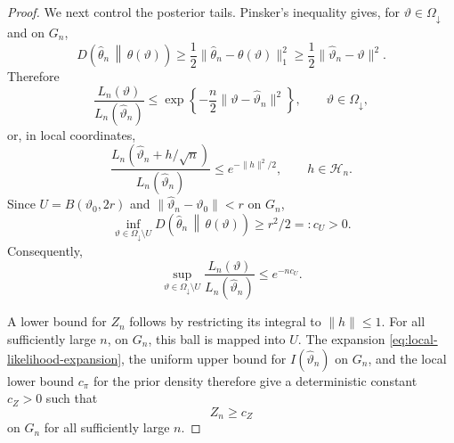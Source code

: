 \documentclass{article}
\theoremstyle{named}
\theoremstyle{named1}
\theoremstyle{plain}
\theoremstyle{remark}
\begin{document}
\begin{proof}
We next control the posterior tails. Pinsker's inequality gives, for
$\vartheta\in\Omega_{\downarrow}$ and on $G_n$,
\[
    D\!\left(\widehat\theta_n\,\middle\|\,\theta(\vartheta)\right)
    \geq\frac12\|\widehat\theta_n-\theta(\vartheta)\|_1^2
    \geq\frac12\|\widehat\vartheta_n-\vartheta\|^2.
\]
Therefore
\begin{equation}
    \frac{L_n(\vartheta)}{L_n(\widehat\vartheta_n)}
    \leq
    \exp\left\{-\frac n2\|\vartheta-\widehat\vartheta_n\|^2\right\},
    \qquad \vartheta\in\Omega_{\downarrow},
    \label{eq:local-gaussian-bound}
\end{equation}
or, in local coordinates,
\begin{equation}
    \frac{L_n(\widehat\vartheta_n+h/\sqrt n)}{
          L_n(\widehat\vartheta_n)}
    \leq e^{-\|h\|^2/2},
    \qquad h\in\mathcal H_n.
    \label{eq:local-h-bound}
\end{equation}
Since $U=B(\vartheta_0,2r)$ and
$\|\widehat\vartheta_n-\vartheta_0\|<r$ on $G_n$,
\begin{equation}
    \inf_{\vartheta\in\Omega_{\downarrow}\setminus U}
    D\!\left(\widehat\theta_n\,\middle\|\,\theta(\vartheta)\right)
    \geq r^2/2=:c_U>0.
    \label{outside_U_bound}
\end{equation}
Consequently,
\begin{equation}
    \sup_{\vartheta\in\Omega_{\downarrow}\setminus U}
    \frac{L_n(\vartheta)}{L_n(\widehat\vartheta_n)}
    \leq e^{-nc_U}.
    \label{eq:outside-neighborhood-bound}
\end{equation}

A lower bound for $Z_n$ follows by restricting its integral to
$\|h\|\leq1$. For all sufficiently large $n$, on $G_n$, this ball is
mapped into $U$. The expansion \eqref{eq:local-likelihood-expansion},
the uniform upper bound for $I(\widehat\vartheta_n)$ on $G_n$, and the
local lower bound $c_\pi$ for the prior density therefore give a
deterministic constant $c_Z>0$ such that
\begin{equation}
    Z_n\geq c_Z
    \label{eq:normalizing-lower-bound}
\end{equation}
on $G_n$ for all sufficiently large $n$.


\end{proof}
\end{document}
